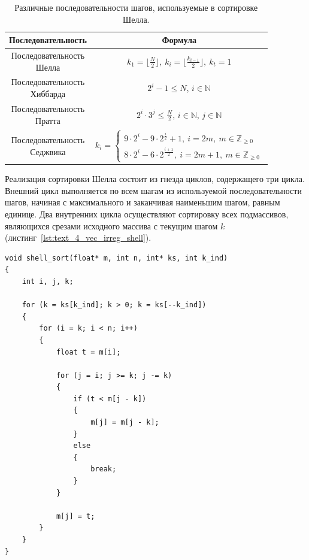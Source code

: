 \begin{table}
\centering
\singlespacing
{}\caption{Различные последовательности шагов, используемые в сортировке Шелла.}
\bigskip
\label{tbl:text_4_vec_irreg_steps}
\begin{tabular}{ | c | c | }
  \hline
  Последовательность & Формула \\ \hline\hline
  \makecell{Последовательность \\ Шелла} & $k_1 = \lfloor \frac{N}{2} \rfloor, \ k_i = \lfloor \frac{k_{i-1}}{2} \rfloor, \ k_t = 1$ \\ \hline
  \makecell{Последовательность \\ Хиббарда \cite{seqHibbard}} & $2^i - 1 \le N$, $i \in \mathbb{N}$ \\ \hline
  \makecell{Последовательность \\ Пратта \cite{seqPratt}} & $2^i \cdot 3^j \le \frac{N}{2}$, $i \in \mathbb{N}$, $j \in \mathbb{N}$ \\ \hline
  \makecell{Последовательность \\ Седжвика \cite{seqSadgwick}} & $k_i = \begin{cases} 9 \cdot 2^i - 9 \cdot 2^{\frac{i}{2}} + 1, \ i = 2m, \ m \in \mathbb{Z}_{\ge 0} \\ 8 \cdot 2^i - 6 \cdot 2^{\frac{i + 1}{2}}, \ i = 2m + 1, \ m \in \mathbb{Z}_{\ge 0} \end{cases}$ \\ \hline
\end{tabular}
\end{table}

Реализация сортировки Шелла состоит из гнезда циклов, содержащего три цикла.
Внешний цикл выполняется по всем шагам из используемой последовательности шагов, начиная с максимального и заканчивая наименьшим шагом, равным единице.
Два внутренних цикла осуществляют сортировку всех подмассивов, являющихся срезами исходного массива с текущим шагом $k$ (листинг~\ref{lst:text_4_vec_irreg_shell}).

\begin{lstlisting}[caption={Реализация сортировки Шелла.},label={lst:text_4_vec_irreg_shell}]
void shell_sort(float* m, int n, int* ks, int k_ind)
{
    int i, j, k;

    for (k = ks[k_ind]; k > 0; k = ks[--k_ind])
    {
        for (i = k; i < n; i++)
        {
            float t = m[i];

            for (j = i; j >= k; j -= k)
            {
                if (t < m[j - k])
                {
                    m[j] = m[j - k];
                }
                else
                {
                    break;
                }
            }

            m[j] = t;
        }
    }
}
\end{lstlisting}

